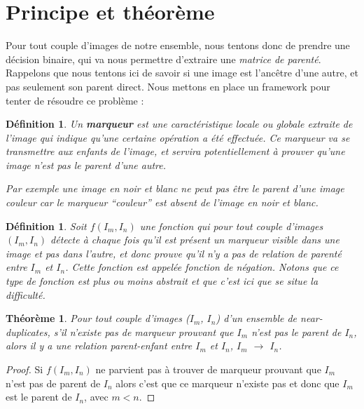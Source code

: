 \documentclass[utf8,final]{stageM2R} %
\begin{document}
\section{Principe et théorème}
\label{sec:method}
Pour tout couple d'images de notre ensemble, nous tentons donc de prendre une décision binaire, qui va nous permettre d'extraire une \textit{matrice de parenté}. Rappelons que nous tentons ici de savoir si une image est l'ancêtre d'une autre, et pas seulement son parent direct. Nous mettons en place un framework pour tenter de résoudre ce problème : 

\newtheorem*{marqueur}{Définition}
\begin{marqueur}
  Un \textbf{marqueur} est une caractéristique locale ou globale extraite de l'image qui indique qu'une certaine opération a été effectuée. Ce marqueur va se transmettre aux enfants de l'image, et servira potentiellement à prouver qu'une image n'est pas le parent d'une autre.

Par exemple une image en noir et blanc ne peut pas être le parent d'une image couleur car le marqueur ``couleur'' est absent de l'image en noir et blanc.
\end{marqueur}

\newtheorem*{fonction}{Définition}
\begin{fonction}
  Soit $f(I_{m},I_{n})$ une fonction qui pour tout couple d'images $(I_{m}, I_{n})$ détecte à chaque fois qu'il est présent un marqueur visible dans une image et pas dans l'autre, et donc prouve qu'il n'y a pas de relation de parenté entre $I_{m}$ et $I_{n}$. Cette fonction est appelée fonction de négation. Notons que ce type de fonction est plus ou moins abstrait et que c'est ici que se situe la difficulté.
\end{fonction}

\newtheorem*{parentage}{Théorème}
\begin{parentage}
  Pour tout couple d'images ($I_{m}$, $I_{n}$) d'un ensemble de near-duplicates, s'il n'existe pas de marqueur prouvant que $I_{m}$ n'est pas le parent de $I_{n}$, alors il y a une relation parent-enfant entre $I_{m}$ et $I_{n}$, $I_{m}$ $\to$ $I_{n}$.
\end{parentage}

\begin{proof}
  Si $f(I_{m},I_{n})$ ne parvient pas à trouver de marqueur prouvant que $I_{m}$ n'est pas de parent de $I_{n}$ alors c'est que ce marqueur n'existe pas et donc que $I_{m}$ est le parent de $I_{n}$, avec $m < n$.
\end{proof}
\end{document}
